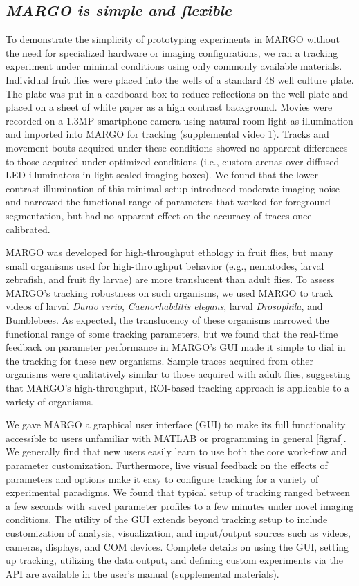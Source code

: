 \documentclass[10pt]{article}
\begin{document}
\begin{multicols}{2}
\subsection*{\textit{MARGO is simple and flexible}}

To demonstrate the simplicity of prototyping experiments in MARGO without the need for specialized hardware or imaging configurations, we ran a tracking experiment under minimal conditions using only commonly available materials.  Individual fruit flies were placed into the wells of a standard 48 well culture plate. The plate was put in a cardboard box to reduce reflections on the well plate and placed on a sheet of white paper as a high contrast background. Movies were recorded on a 1.3MP smartphone camera using natural room light as illumination and imported into MARGO for tracking (supplemental video 1). Tracks and movement bouts acquired under these conditions showed no apparent differences to those acquired under optimized conditions (i.e., custom arenas over diffused LED illuminators in light-sealed imaging boxes). We found that the lower contrast illumination of this minimal setup introduced moderate imaging noise and narrowed the functional range of parameters that worked for foreground segmentation, but had no apparent effect on the accuracy of traces once calibrated.

MARGO was developed for high-throughput ethology in fruit flies, but many small organisms used for high-throughput behavior (e.g., nematodes, larval zebrafish, and fruit fly larvae) are more translucent than adult flies. To assess MARGO’s tracking robustness on such organisms, we used MARGO to track videos of larval \emph{Danio rerio}, \emph{Caenorhabditis elegans}, larval \emph{Drosophila}, and Bumblebees. As expected, the translucency of these organisms narrowed the functional range of some tracking parameters, but we found that the real-time feedback on parameter performance in MARGO's GUI made it simple to dial in the tracking for these new organisms. Sample traces acquired from other organisms were qualitatively similar to those acquired with adult flies, suggesting that MARGO’s high-throughput, ROI-based tracking approach is applicable to a variety of organisms.

We gave MARGO a graphical user interface (GUI) to make its full functionality accessible to users unfamiliar with MATLAB or programming in general [figraf]. We generally find that new users easily learn to use both the core work-flow and parameter customization. Furthermore, live visual feedback on the effects of parameters and options make it easy to configure tracking for a variety of experimental paradigms. We found that typical setup of tracking ranged between a few seconds with saved parameter profiles to a few minutes under novel imaging conditions. The utility of the GUI extends beyond tracking setup to include customization of analysis, visualization, and input/output sources such as videos, cameras, displays, and COM devices. Complete details on using the GUI, setting up tracking, utilizing the data output, and defining custom experiments via the API are available in the user's manual (supplemental materials).



\end{multicols}
\end{document}
